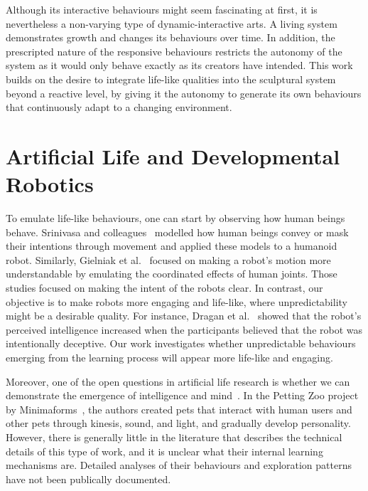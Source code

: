 Although its interactive behaviours might seem fascinating at first, it is nevertheless a non-varying type of dynamic-interactive arts. A living system demonstrates growth and changes its behaviours over time. In addition, the prescripted nature of the responsive behaviours restricts the autonomy of the system as it would only behave exactly as its creators have intended. This work builds on the desire to integrate life-like qualities into the sculptural system beyond a reactive level, by giving it the autonomy to generate its own behaviours that continuously adapt to a changing environment.



\section{Artificial Life and Developmental Robotics}

To emulate life-like behaviours, one can start by observing how human beings behave. Srinivasa and colleagues~\cite{Dragan2015}\cite{AncaDraga2014} modelled how human beings convey or mask their intentions through movement and applied these models to a humanoid robot. Similarly, Gielniak et al.~\cite{Gielniak2013} focused on making a robot's motion more understandable by emulating the coordinated effects of human joints. Those studies focused on making the intent of the robots clear. In contrast, our objective is to make robots more engaging and life-like, where unpredictability might be a desirable quality. For instance, Dragan et al.~\cite{AncaDraga2014} showed that the robot's perceived intelligence increased when the participants believed that the robot was intentionally deceptive. Our work investigates whether unpredictable behaviours emerging from the learning process will appear more life-like and engaging.

Moreover, one of the open questions in artificial life research is whether we can demonstrate the emergence of intelligence and mind~\cite{Bedau2000}. In the Petting Zoo project by Minimaforms~\cite{Minimaforms}, the authors created pets that interact with human users and other pets through kinesis, sound, and light, and gradually develop personality. However, there is generally little in the literature that describes the technical details of this type of work, and it is unclear what their internal learning mechanisms are. Detailed analyses of their behaviours and exploration patterns have not been publically documented. 

